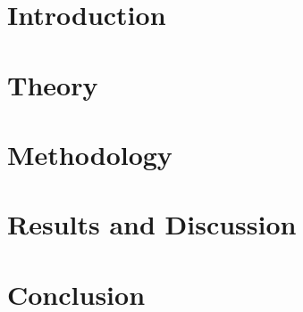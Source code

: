 \documentclass[11pt]{thelongcat-report}
\begin{document}
\maketitle

\begin{abstract}
\label{sec:abstract}

\end{abstract}

\section{Introduction}
\label{sec:introduction}


\section{Theory}
\label{sec:theory}


\section{Methodology}
\label{sec:methodology}


\section{Results and Discussion}
\label{sec:results}


\section{Conclusion}
\label{sec:conclusion}






\appendix
{}
\end{document}
